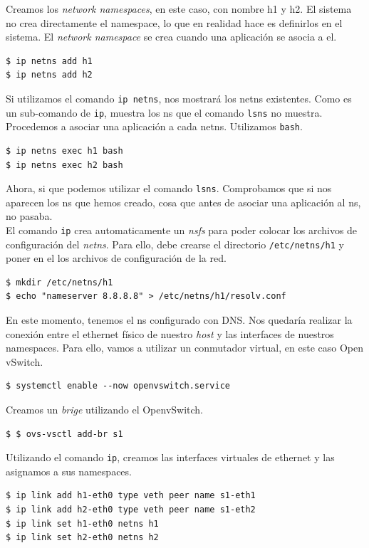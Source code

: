 \documentclass[12pt]{article}
\begin{document}
	\noindent Creamos los \textit{network namespaces}, en este caso, con nombre h1 y h2. El sistema no crea directamente el namespace, lo que en realidad hace es definirlos en el sistema. El \textit{network namespace} se crea cuando una aplicación se asocia a el.
	\begin{verbatim}
$ ip netns add h1
$ ip netns add h2
	\end{verbatim}

	\noindent Si utilizamos el comando \texttt{ip netns}, nos mostrará los netns existentes. Como es un sub-comando de \texttt{ip}, muestra los ns que el comando \texttt{lsns} no muestra. \\
	
	\noindent Procedemos a asociar una aplicación a cada netns. Utilizamos \texttt{bash}.
	\begin{verbatim}
$ ip netns exec h1 bash
$ ip netns exec h2 bash
	\end{verbatim}

	\noindent Ahora, si que podemos utilizar el comando \texttt{lsns}. Comprobamos que si nos aparecen los ns que hemos creado, cosa que antes de asociar una aplicación al ns, no pasaba. \\
	
	\noindent El comando \texttt{ip} crea automaticamente un \textit{nsfs} para poder colocar los archivos de configuración del \textit{netns}. Para ello, debe crearse el directorio \texttt{/etc/netns/h1} y poner en el los archivos de configuración de la red.
	\begin{verbatim}
$ mkdir /etc/netns/h1
$ echo "nameserver 8.8.8.8" > /etc/netns/h1/resolv.conf
	\end{verbatim}

	\noindent En este momento, tenemos el ns configurado con DNS. Nos quedaría realizar la conexión entre el ethernet físico de nuestro \textit{host} y las interfaces de nuestros namespaces. Para ello, vamos a utilizar un conmutador virtual, en este caso Open vSwitch.
	\begin{verbatim}
$ systemctl enable --now openvswitch.service
	\end{verbatim}

	\noindent Creamos un \textit{brige} utilizando el OpenvSwitch.
	\begin{verbatim}
$ $ ovs-vsctl add-br s1
	\end{verbatim}

	\noindent Utilizando el comando \texttt{ip}, creamos las interfaces virtuales de ethernet y las asignamos a sus namespaces.
	\begin{verbatim}
$ ip link add h1-eth0 type veth peer name s1-eth1
$ ip link add h2-eth0 type veth peer name s1-eth2
$ ip link set h1-eth0 netns h1
$ ip link set h2-eth0 netns h2
	\end{verbatim}
\end{document}
